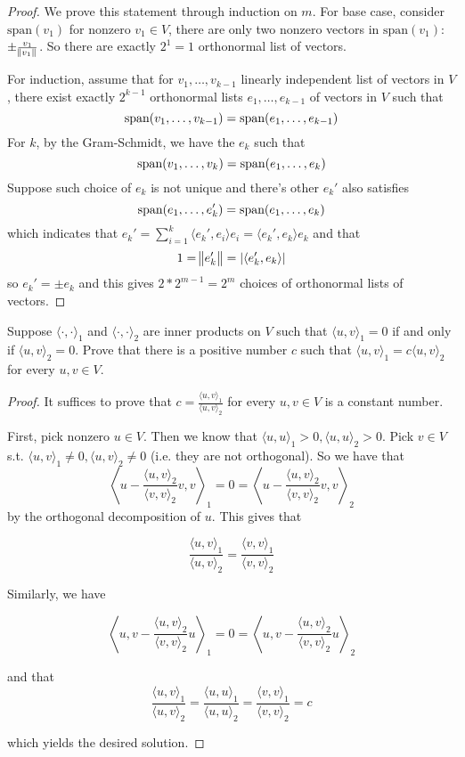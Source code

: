 \documentclass{extarticle}
\begin{document}
\begin{proof}
We prove this statement through induction on \(m\). For base case, consider \(\text{span}(v_1)\) for 
nonzero \(v_1 \in V\), there are only two nonzero vectors in \(\text{span}(v_1)\): \(\pm \frac{v_1}{\norm{v_1}}\). 
So there are exactly \(2^1 = 1\) orthonormal list of vectors. 

For induction, assume that for \(v_1, \ldots, v_{k-1}\) linearly independent list of vectors in \(V\), 
there exist exactly \(2^{k-1}\) orthonormal lists \(e_1, \ldots, e_{k-1}\) of vectors in \(V\) such that 
\[\text{span} (v_1, \ldots, v_{k-1}) = \text{span} (e_1, \ldots, e_{k-1})\]
For \(k\), by the Gram-Schmidt, we have the \(e_k\) such that 
\[\text{span} (v_1, \ldots, v_k) = \text{span} (e_1, \ldots, e_k)\]
Suppose such choice of \(e_k\) is not unique and there's other \(e_k'\) also satisfies 
\[\text{span}(e_1, \ldots, e_k') = \text{span}(e_1, \ldots, e_k)\]
which indicates that \(e_k' = \sum_{i=1}^{k} \langle e_k',e_i \rangle e_i = \langle e_k',e_k \rangle e_k\) and that 
\[1 = \norm{e_k'} = |\langle e_k', e_k \rangle|\]
so \(e_k' = \pm e_k\) and this gives \(2 * 2^{m-1} = 2^m\) choices of orthonormal lists of vectors.
\end{proof}

\begin{problem}{15}
    Suppose \(\langle \cdot,\cdot \rangle_1\) and \(\langle \cdot,\cdot \rangle_2\) are inner products on 
    \(V\) such that \(\langle u,v \rangle_1 = 0\) if and only if \(\langle u,v \rangle_2 = 0\). Prove that 
    there is a positive number \(c\) such that \(\langle u,v \rangle_1 = c \langle u,v \rangle_2\) for 
    every \(u, v \in V\).
\end{problem}

\begin{proof}
It suffices to prove that \(c = \frac{\langle u,v \rangle_1}{\langle u,v \rangle_2}\) for every 
\(u, v \in V\) is a constant number.

First, pick nonzero \(u \in V\). Then we know that \(\langle u,u \rangle_1 > 0, \langle u,u \rangle_2 > 0\).
Pick \(v \in V\) s.t. \(\langle u,v \rangle_1 \neq 0, \langle u,v \rangle_2 \neq 0\) (i.e. they are not 
orthogonal). So we have that 
\[ \left\langle u - \frac{\langle u,v \rangle_2}{\langle v,v \rangle_2}v, v \right\rangle_1 = 0  = 
\left\langle u - \frac{\langle u,v \rangle_2}{\langle v,v \rangle_2}v, v \right\rangle_2 \]
by the orthogonal decomposition of \(u\). This gives that 

\[\frac{\langle u,v \rangle_1}{\langle u,v \rangle_2} = \frac{\langle v,v \rangle_1}{\langle v,v \rangle_2}\]

Similarly, we have 

\[ \left\langle u , v - \frac{\langle u,v \rangle_2}{\langle v,v \rangle_2}u \right\rangle_1 = 0  = 
\left\langle u , v - \frac{\langle u,v \rangle_2}{\langle v,v \rangle_2}u \right\rangle_2 \]

and that 
\[\frac{\langle u,v \rangle_1}{\langle u,v \rangle_2} = \frac{\langle u,u \rangle_1}{\langle u,u \rangle_2} 
= \frac{\langle v,v \rangle_1}{\langle v,v \rangle_2} = c\]

which yields the desired solution. 
\end{proof}
\end{document}
